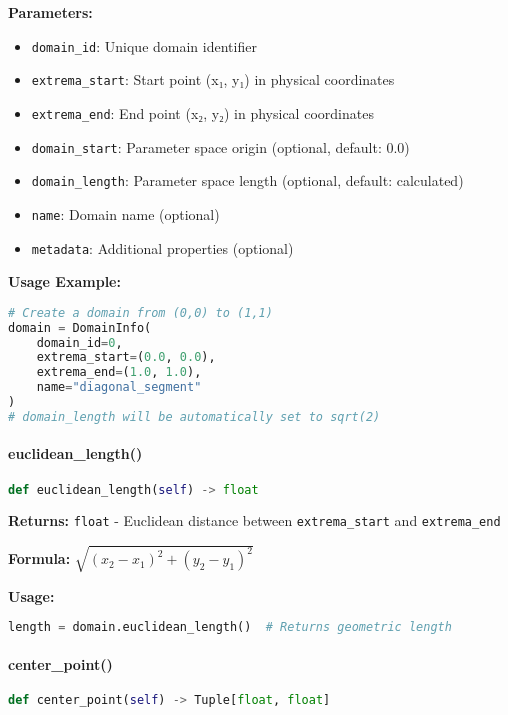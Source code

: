 \textbf{Parameters:}
\begin{itemize}
    \item \texttt{domain\_id}: Unique domain identifier
    \item \texttt{extrema\_start}: Start point (x₁, y₁) in physical coordinates
    \item \texttt{extrema\_end}: End point (x₂, y₂) in physical coordinates
    \item \texttt{domain\_start}: Parameter space origin (optional, default: 0.0)
    \item \texttt{domain\_length}: Parameter space length (optional, default: calculated)
    \item \texttt{name}: Domain name (optional)
    \item \texttt{metadata}: Additional properties (optional)
\end{itemize}

\textbf{Usage Example:}
\begin{lstlisting}[language=Python, caption=DomainInfo Usage]
# Create a domain from (0,0) to (1,1)
domain = DomainInfo(
    domain_id=0,
    extrema_start=(0.0, 0.0),
    extrema_end=(1.0, 1.0),
    name="diagonal_segment"
)
# domain_length will be automatically set to sqrt(2)
\end{lstlisting}

\paragraph{euclidean\_length()}
\begin{lstlisting}[language=Python, caption=Euclidean Length Calculation]
def euclidean_length(self) -> float
\end{lstlisting}

\textbf{Returns:} \texttt{float} - Euclidean distance between \texttt{extrema\_start} and \texttt{extrema\_end}

\textbf{Formula:} $\sqrt{(x_2-x_1)^2 + (y_2-y_1)^2}$

\textbf{Usage:}
\begin{lstlisting}[language=Python]
length = domain.euclidean_length()  # Returns geometric length
\end{lstlisting}

\paragraph{center\_point()}
\begin{lstlisting}[language=Python, caption=Center Point Calculation]
def center_point(self) -> Tuple[float, float]
\end{lstlisting}

